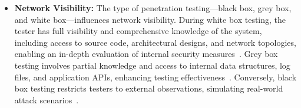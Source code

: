 \begin{itemize}
    \item \textbf{Network Visibility:} The type of penetration testing—black box, grey box, and white box—influences network visibility. 
    During white box testing, the tester has full visibility and comprehensive knowledge of the system, including access to source code, architectural designs, and network topologies, enabling an in-depth evaluation of internal security measures~\cite{Midian, al2018study, filiol2021method, shravan2014penetration}. 
    Grey box testing involves partial knowledge and access to internal data structures, log files, and application APIs, enhancing testing effectiveness~\cite{goel2015vulnerability, filiol2021method, demott2007revolutionizing}. Conversely, black box testing restricts testers to external observations, simulating real-world attack scenarios~\cite{Midian, awang2013detecting, goel2015vulnerability, al2018study, filiol2021method}. 

\end{itemize}





